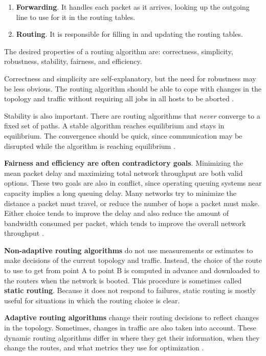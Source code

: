\begin{enumerate}
    \item \textbf{Forwarding}.
    It handles each packet as it arrives, looking up the outgoing line to use for it in the routing tables.
    \item \textbf{Routing}.
    It is responsible for filling in and updating the routing tables.
\end{enumerate}

The desired properties of a routing algorithm are: correctness, simplicity, robustness, stability, fairness, and efficiency.

Correctness and simplicity are self-explanatory, but the need for robustness may be less obvious.
The routing algorithm should be able to cope with changes in the topology and traffic without requiring all jobs in all hosts to be aborted \cite[p.~363]{computer-networks-tanenbaum-2012}.

Stability is also important. There are routing algorithms that \textit{never} converge to a fixed set of paths.
A stable algorithm reaches equilibrium and stays in equilibrium.
The convergence should be quick, since communication may be disrupted while the algorithm is reaching equilibrium \cite[p.~363]{computer-networks-tanenbaum-2012}.

\textbf{Fairness and efficiency are often contradictory goals}.
Minimizing the mean packet delay and maximizing total network throughput are both valid options.
These two goals are also in conflict, since operating queuing systems near capacity implies a long queuing delay.
Many networks try to minimize the distance a packet must travel, or reduce the number of hops a packet must make.
Either choice tends to improve the delay and also reduce the amount of bandwidth consumed per packet, which tends to improve the overall network throughput \cite[p.~363]{computer-networks-tanenbaum-2012}.

\textbf{Non-adaptive routing algorithms} do not use measurements or estimates to make decisions of the current topology and traffic.
Instead, the choice of the route to use to get from point A to point B is computed in advance and downloaded to the routers when the network is booted.
This procedure is sometimes called \textbf{static routing}.
Because it does not respond to failures, static routing is mostly useful for situations in which the routing choice is clear.

\textbf{Adaptive routing algorithms} change their routing decisions to reflect changes in the topology.
Sometimes, changes in traffic are also taken into account.
These dynamic routing algorithms differ in where they get their information, when they change the routes, and what metrics they use for optimization \cite[p.~364]{computer-networks-tanenbaum-2012}.

